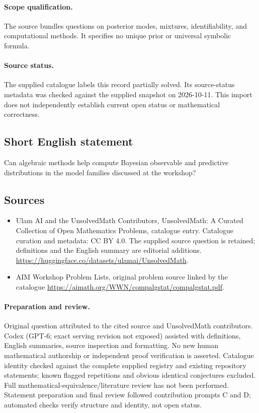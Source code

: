 \documentclass[11pt]{article}
\begin{document}
\paragraph{Scope qualification.}
The source bundles questions on posterior modes, mixtures, identifiability, and computational methods. It specifies no unique prior or universal symbolic formula.
\paragraph{Source status.}
The supplied catalogue labels this record partially solved. Its source-status metadata was checked against the supplied snapshot on 2026-10-11. This import does not independently establish current open status or mathematical correctness.
\subsection{Short English statement}
Can algebraic methods help compute Bayesian observable and predictive distributions in the model families discussed at the workshop?
\subsection{Sources}
\begin{itemize}
\item[S1] Ulam AI and the UnsolvedMath Contributors, UnsolvedMath: A Curated Collection of Open Mathematics Problems, catalogue entry. Catalogue curation and metadata: CC BY 4.0. The supplied source question is retained; definitions and the English summary are editorial additions.
\url{https://huggingface.co/datasets/ulamai/UnsolvedMath}.
\item[S2] AIM Workshop Problem Lists, original problem source linked by the catalogue
\url{https://aimath.org/WWN/compalgstat/compalgstat.pdf}.
\end{itemize}
\paragraph{Preparation and review.}
Original question attributed to the cited source and UnsolvedMath contributors. Codex (GPT-6; exact serving revision not exposed) assisted with definitions, English summaries, source inspection and formatting. No new human mathematical authorship or independent proof verification is asserted. Catalogue identity checked against the complete supplied registry and existing repository statements; known flagged repetitions and obvious identical conjectures excluded. Full mathematical-equivalence/literature review has not been performed. Statement preparation and final review followed contribution prompts C and D; automated checks verify structure and identity, not open status.
\label{end:statement}
\end{document}

